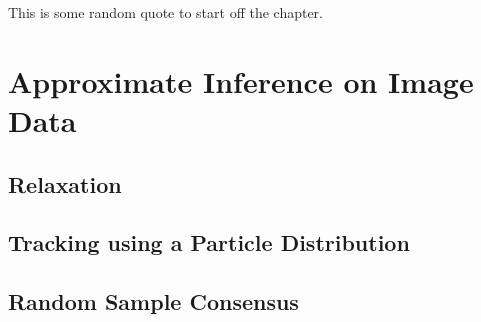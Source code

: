 \begin{savequote}[75mm]
This is some random quote to start off the chapter.
\end{savequote}

\chapter{Approximate Inference on Image Data}
\section{Relaxation }
\section{Tracking using a Particle Distribution}
\section{Random Sample Consensus}
